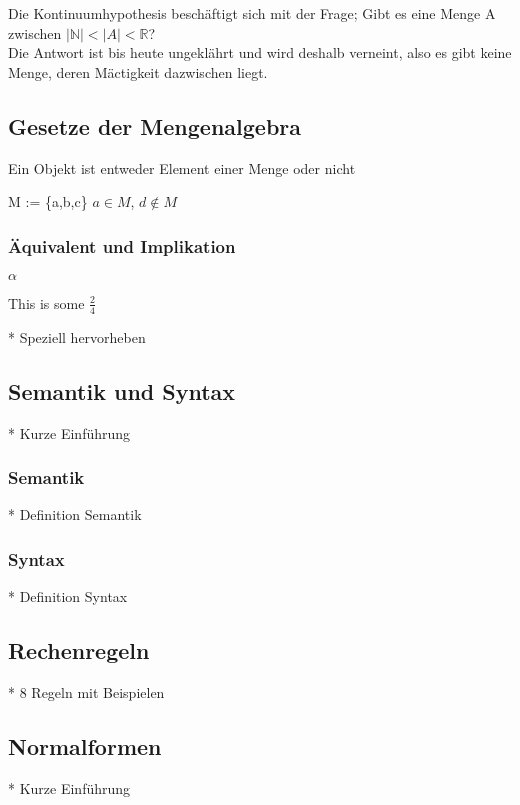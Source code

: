 \documentclass[../gruppenarbeit_1.tex]{subfiles}
\begin{document}
Die Kontinuumhypothesis beschäftigt sich mit der Frage; Gibt es eine Menge A zwischen $|\mathbb{N}| < |A| < \mathbb{R}$?\\
Die Antwort ist bis heute ungeklährt und wird deshalb verneint, also es gibt keine Menge, deren Mäctigkeit dazwischen liegt.

\subsection{Gesetze der Mengenalgebra}

Ein Objekt ist entweder Element einer Menge oder nicht

M := \{a,b,c\} $a \in M$, $d \notin M$


\subsubsection{Äquivalent und Implikation}

$\alpha$

This is some $\frac{2}{4}$

* Speziell hervorheben

\subsection{Semantik und Syntax}

* Kurze Einführung

\subsubsection{Semantik}

* Definition Semantik

\subsubsection{Syntax}

* Definition Syntax

\subsection{Rechenregeln}

* 8 Regeln mit Beispielen

\subsection{Normalformen}

* Kurze Einführung
\end{document}
